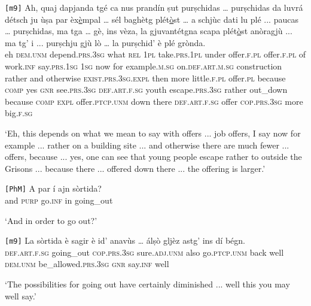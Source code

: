 \begin{linenumbers}
	\gll  \texttt{[m9]} Ah, quaj dapjanda tgé ca nus prandín ṣut purṣchidas … purṣchidas da luvrá détsch ju ùṣa par èx\underline{è}mpal … sél baghètg plét\underline{ò}st … a schjùc dati lu plé ... paucas … purṣchidas, ma tga … gè, ins vèza, la gjuvantétgna scapa plét\underline{ò}st anòragjù ... ma tg’ i ... purṣchju gjù lò … la purṣchid’ è plé grònda.\\
	{} eh \textsc{dem.unm} depend.\textsc{prs.3sg} what \textsc{rel} \textsc{1pl} take.\textsc{prs.1pl} under offer.\textsc{f.pl} {} offer.\textsc{f.pl} of work.\textsc{inf} say.\textsc{prs.1sg} \textsc{1sg} now for example.\textsc{m.sg} {} on.\textsc{def.art.m.sg} construction rather {} and otherwise \textsc{exist.prs.3sg.expl} then more {} little.\textsc{f.pl} {} offer.\textsc{pl} because \textsc{comp} {} yes \textsc{gnr} see.\textsc{prs.3sg} \textsc{def.art.f.sg} youth escape.\textsc{prs.3sg} rather out\_down {} because \textsc{comp} \textsc{expl} {} offer.\textsc{ptcp.unm} down there {} \textsc{def.art.f.sg} offer \textsc{cop.prs.3sg} more big.\textsc{f.sg} \\
\end{linenumbers}
\medskip
\glt `Eh, this depends on what we mean to say with offers ... job offers, I say now for example ... rather on a building site ... and otherwise there are much fewer ... offers, because ... yes, one can see that young people escape rather to outside the Grisons ... because there ... offered down there ... the offering is larger.'
\medskip

\begin{linenumbers}
	\gll \texttt{[PhM]} A par í ajn sòrtida?\\
	{} and \textsc{purp} go.\textsc{inf} in going\_out\\
\end{linenumbers}
\medskip
\glt `And in order to go out?'
\medskip

\begin{linenumbers}
	\gll \texttt{[m9]} La sòrtida è sagir è id’ anavùs … álṣò gljèz astg’ ins dí bégn.  \\
	{} \textsc{def.art.f.sg} going\_out \textsc{cop.prs.3sg} sure.\textsc{adj.unm} also go.\textsc{ptcp.unm} back {} well \textsc{dem.unm} be\_allowed.\textsc{prs.3sg} \textsc{gnr} say.\textsc{inf} well \\
\end{linenumbers}
\medskip
\glt `The possibilities for going out have certainly diminished ... well this you may well say.'
\medskip


